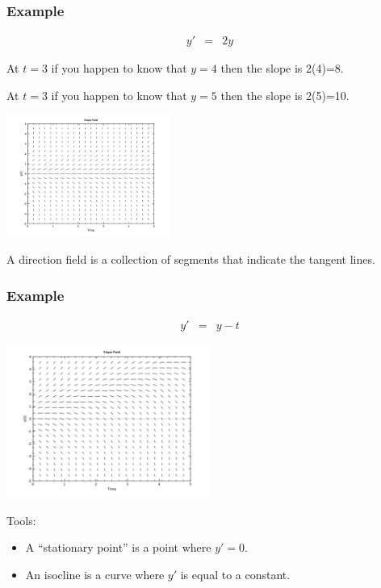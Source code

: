\begin{frame}
  \frametitle{Example}

  \vspace*{-4em}

  \begin{eqnarray*}
    y' & = & 2y
  \end{eqnarray*}

  At $t=3$ if you happen to know that $y=4$ then the slope is 2(4)=8.

  At $t=3$ if you happen to know that $y=5$ then the slope is 2(5)=10.

  \includegraphics[height=4cm]{week1Day2SlopeField}

  A direction field is a collection of segments that indicate the
  tangent lines. 
  
\end{frame}


\begin{frame}
  \frametitle{Example}

  \vspace*{-4em}

  \begin{eqnarray*}
    y' & = & y - t
  \end{eqnarray*}

  \includegraphics[height=5cm]{week1Day2SlopeField2}

  Tools:
  \begin{itemize}
  \item A ``stationary point'' is a point where $y'=0$.
  \item An isocline is a curve where $y'$ is equal to a constant.
  \end{itemize}

\end{frame}


